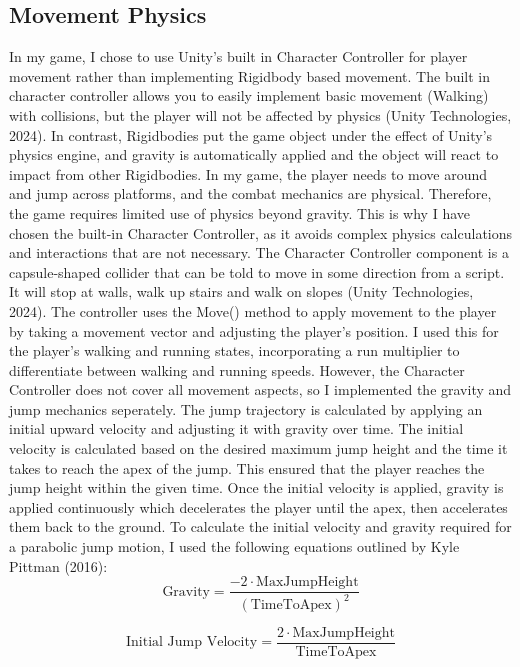 \documentclass[]{final_report}
\begin{document}
\subsection{Movement Physics}
In my game, I chose to use Unity's built in Character Controller for player movement rather than implementing Rigidbody based movement. The built in character controller allows you to easily implement basic movement (Walking) with collisions, but the player will not be affected by physics (Unity Technologies, 2024). In contrast, Rigidbodies put the game object under the effect of Unity's physics engine, and gravity is automatically applied and the object will react to impact from other Rigidbodies. In my game, the player needs to move around and jump across platforms, and the combat mechanics are physical. Therefore, the game requires limited use of physics beyond gravity.  This is why I have chosen the built-in Character Controller, as it avoids complex physics calculations and interactions that are not necessary. \newline
The Character Controller component is a capsule-shaped collider that can be told to move in some direction from a script. It will stop at walls, walk up stairs and walk on slopes (Unity Technologies, 2024). The controller uses the Move() method to apply movement to the player by taking a movement vector and adjusting the player's position. I used this for the player's walking and running states, incorporating a run multiplier to differentiate between walking and running speeds. However, the Character Controller does not cover all movement aspects, so I implemented the gravity and jump mechanics seperately.  \newline
The jump trajectory is calculated by applying an initial upward velocity and adjusting it with gravity over time. The initial velocity is calculated based on the desired maximum jump height and the time it takes to reach the apex of the jump. This ensured that the player reaches the jump height within the given time. Once the initial velocity is applied, gravity is applied continuously which decelerates the player until the apex, then accelerates them back to the ground. To calculate the initial velocity and gravity required for a parabolic jump motion, I used the following equations outlined by Kyle Pittman (2016):
\begin{equation}
\text{Gravity} = \frac{-2 \cdot \text{MaxJumpHeight}}{(\text{TimeToApex})^2}
\end{equation}

\begin{equation}
\text{Initial Jump Velocity} = \frac{2 \cdot \text{MaxJumpHeight}}{\text{TimeToApex}}
\end{equation}
\end{document}
